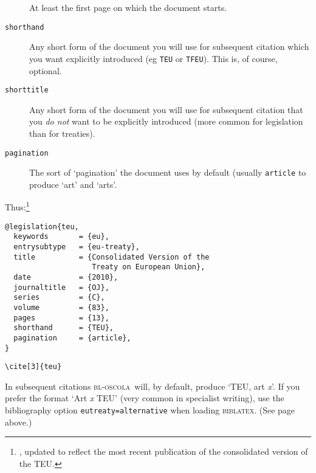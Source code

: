 \documentclass[a4paper,
               11pt,
	       DIV=1,			   
	       footinclude=false]
	      {scrartcl}
\newcommand{\oscola}{\textsc{bl-oscola}}
\newcommand{\biblatex}{\textsc{biblatex}}
\newcounter{egcounter}\setcounter{egcounter}{0}
\newlength{\boxwidth}
\newenvironment{bibexample}[1][]
{%
  \medskip\par\noindent\ignorespaces
  \marginpar{[\refstepcounter{egcounter}\arabic{egcounter}]\label{#1}}%
  \setlength{\boxwidth}{0.95\linewidth}%
  \addtolength{\boxwidth}{-2\fboxsep}
  \addtolength{\boxwidth}{-2\fboxrule}
  \begin{lrbox}{\boxcontainer}
  \begin{minipage}[t]{\boxwidth}%
}
{%
  \end{minipage}\end{lrbox}%
  \colorbox{gray!30}{\usebox{\boxcontainer}}
  \par\medskip}
\newcommand{\egcite}[1]{{\texttt{\textbackslash cite#1}}}
\begin{document}
\begin{description}
 At least the first page on which the document starts.
\item[\texttt{shorthand}]
Any short form of the document you will use
  for subsequent citation which you want explicitly introduced (eg
  \texttt{TEU} or \texttt{TFEU}). This is, of course, optional.
\item[\texttt{shorttitle}]
Any short form of the document you will use
  for subsequent citation that you \emph{do not} want to be explicitly
  introduced (more common for legislation than for treaties).
\item[\texttt{pagination}]
 The sort of `pagination' the document uses
  by default (usually \texttt{article} to produce `art' and `arts'.
\end{description}

Thus:\footnote{\cite[29]{oscola}, updated to reflect the most recent
  publication of the consolidated version of the TEU.}
\begin{bibexample}[teu]
\begin{verbatim}
@legislation{teu,
  keywords       = {eu},
  entrysubtype   = {eu-treaty},
  title          = {Consolidated Version of the 
                    Treaty on European Union},
  date           = {2010},
  journaltitle   = {OJ},
  series         = {C},
  volume         = {83},
  pages          = {13},
  shorthand      = {TEU},
  pagination     = {article},
}
\end{verbatim}
\end{bibexample}

\begin{description}
\item[\egcite{[3]\{teu\}}] \cite[3]{teu}
\end{description}

In subsequent citations \oscola\ will, by default, produce `TEU, art
\emph{x}'. If you prefer the format `Art \emph{x} TEU' (very common in
specialist writing), use the bibliography option
\texttt{eutreaty={}alternative} when loading \biblatex. (See page
\pageref{options} above.)
\end{document}
